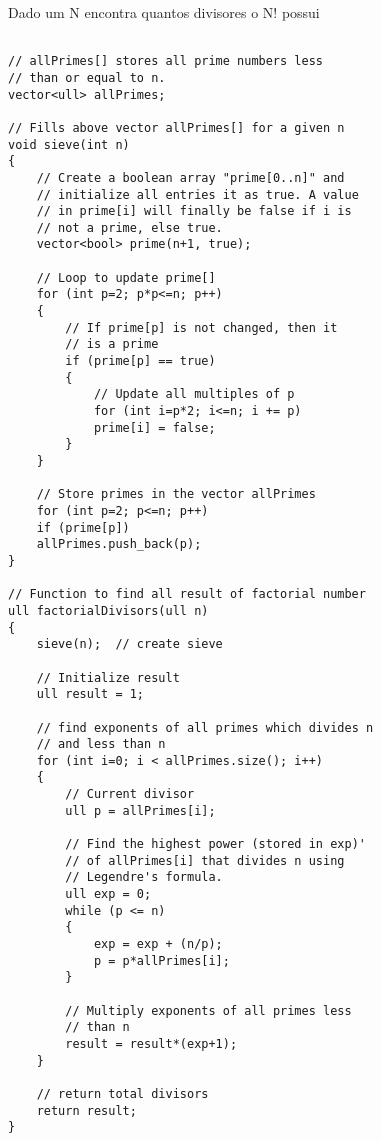 Dado um N encontra quantos divisores o N! possui
\begin{multicols}{2}
	\begin{lstlisting}

// allPrimes[] stores all prime numbers less
// than or equal to n.
vector<ull> allPrimes;

// Fills above vector allPrimes[] for a given n
void sieve(int n)
{
	// Create a boolean array "prime[0..n]" and
	// initialize all entries it as true. A value
	// in prime[i] will finally be false if i is
	// not a prime, else true.
	vector<bool> prime(n+1, true);
	
	// Loop to update prime[]
	for (int p=2; p*p<=n; p++)
	{
		// If prime[p] is not changed, then it
		// is a prime
		if (prime[p] == true)
		{
			// Update all multiples of p
			for (int i=p*2; i<=n; i += p)
			prime[i] = false;
		}
	}
	
	// Store primes in the vector allPrimes
	for (int p=2; p<=n; p++)
	if (prime[p])
	allPrimes.push_back(p);
}

// Function to find all result of factorial number
ull factorialDivisors(ull n)
{
	sieve(n);  // create sieve
	
	// Initialize result
	ull result = 1;
	
	// find exponents of all primes which divides n
	// and less than n
	for (int i=0; i < allPrimes.size(); i++)
	{
		// Current divisor
		ull p = allPrimes[i];
		
		// Find the highest power (stored in exp)'
		// of allPrimes[i] that divides n using
		// Legendre's formula.
		ull exp = 0;
		while (p <= n)
		{
			exp = exp + (n/p);
			p = p*allPrimes[i];
		}
		
		// Multiply exponents of all primes less
		// than n
		result = result*(exp+1);
	}
	
	// return total divisors
	return result;
}
\end{lstlisting}
\end{multicols}